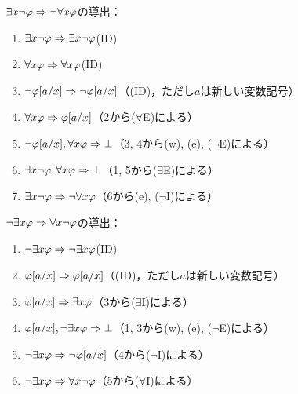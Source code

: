 \(\exists x \lnot \varphi \Rightarrow \lnot \forall x \varphi\)の導出：
\begin{enumerate}
	\item \(\exists x \lnot \varphi \Rightarrow \exists x \lnot \varphi\)\quad (ID)
	\item \(\forall x \varphi \Rightarrow \forall x \varphi\)\quad (ID)
	\item \(\lnot \subst{\varphi}{a/x} \sequent \lnot \subst{\varphi}{a/x}\)\quad （(ID)，ただし\(a\)は新しい変数記号）
	\item \(\forall x \varphi \sequent \subst{\varphi}{a/x}\)\quad （2から(\(\forall\)E)による）
	\item \(\lnot \subst{\varphi}{a/x}, \forall x \varphi \sequent \bot\)\quad （3, 4から(w), (e), (\(\lnot\)E)による）
	\item \(\exists x \lnot \varphi, \forall x \varphi \Rightarrow \bot\)\quad （1, 5から(\(\exists\)E)による）
	\item \(\exists x \lnot \varphi \Rightarrow \lnot \forall x \varphi\)\quad （6から(e), (\(\lnot\)I)による）
\end{enumerate}

\(\lnot \exists x \varphi \Rightarrow \forall x \lnot \varphi\)の導出：
\begin{enumerate}
	\item \(\lnot \exists x \varphi \Rightarrow \lnot \exists x \varphi\)\quad (ID)
	\item \(\subst{\varphi}{a/x} \sequent \subst{\varphi}{a/x}\)\quad （(ID)，ただし\(a\)は新しい変数記号）
	\item \(\subst{\varphi}{a/x} \sequent \exists x \varphi\)\quad （3から(\(\exists\)I)による）
	\item \(\subst{\varphi}{a/x}, \lnot \exists x \varphi \sequent \bot\)\quad （1, 3から(w), (e), (\(\lnot\)E)による）
	\item \(\lnot \exists x \varphi \sequent \lnot \subst{\varphi}{a/x}\)\quad （4から(\(\lnot\)I)による）
	\item \(\lnot \exists x \varphi \Rightarrow \forall x \lnot \varphi\)\quad （5から(\(\forall\)I)による）
\end{enumerate}

